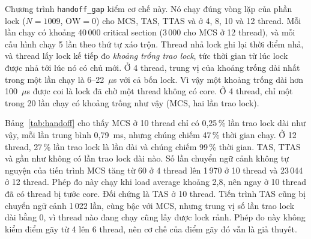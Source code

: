 Chương trình \texttt{handoff\_gap} kiểm cơ chế này. Nó chạy đúng vòng lặp của phần lock ($N = 1009$,
$\mathrm{OW} = 0$) cho MCS, TAS, TTAS và  ở 4, 8, 10 và 12 thread. Mỗi lần chạy có
khoảng 40\,000 critical section (3\,000 cho MCS ở 12 thread), và mỗi cấu hình chạy 5 lần theo thứ tự
xáo trộn. Thread nhả lock ghi lại thời điểm nhả, và thread lấy lock kế tiếp đo \emph{khoảng trống trao
lock}, tức thời gian từ lúc lock được nhả tới lúc nó có chủ mới. Ở 4 thread, trung vị của khoảng trống
dài nhất trong một lần chạy là 6--22~$\mu$s với cả bốn lock. Vì vậy một khoảng trống dài hơn
100~$\mu$s được coi là lock đã chờ một thread không có core. Ở 4 thread, chỉ một trong 20 lần chạy có
khoảng trống như vậy (MCS, hai lần trao lock).

Bảng~\ref{tab:handoff} cho thấy MCS ở 10 thread chỉ có 0,25\,\% lần trao lock dài như vậy, mỗi lần
trung bình 0,79~ms, nhưng chúng chiếm 47\,\% thời gian chạy. Ở 12 thread, 27\,\% lần trao lock là lần
dài và chúng chiếm 99\,\% thời gian. TAS, TTAS và  gần như không có lần trao lock dài
nào. Số lần chuyển ngữ cảnh không tự nguyện của tiến trình MCS tăng từ 60 ở 4 thread lên 1\,970 ở 10
thread và 23\,044 ở 12 thread. Phép đo này chạy khi load average khoảng 2,8, nên ngay ở 10 thread đã có
thread bị tước core. Đối chứng là TAS ở 10 thread. Tiến trình TAS cũng bị chuyển ngữ cảnh 1\,022 lần,
cùng bậc với MCS, nhưng trung vị số lần trao lock dài bằng 0, vì thread nào đang chạy cũng lấy được lock
rảnh. Phép đo này không kiểm điểm gãy từ 4 lên 6 thread, nên cơ chế của điểm gãy đó vẫn là giả thuyết.

